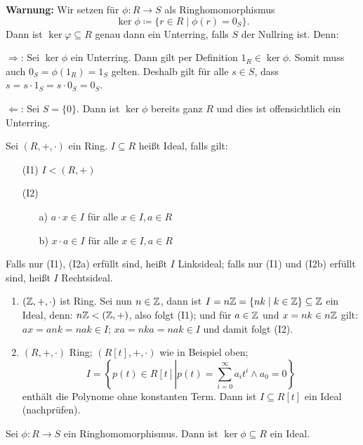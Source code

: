 \documentclass[12pt,a4paper]{scrartcl}
\begin{document}
\noindent
\textbf{Warnung:} Wir setzen für $\phi\colon R\to S$ als Ringhomomorphismus
\[\ker\phi \coloneqq \{r\in R\mid\phi(r)= 0_S\}.\] Dann ist $\ker\varphi\subseteq R$ genau dann ein Unterring, falls $S$ der Nullring ist. Denn:

\glqq $\Rightarrow$\grqq: Sei $\ker\phi$ ein Unterring. Dann gilt per Definition $1_R\in \ker \phi$. Somit muss auch $0_S = \phi (1_R) = 1_S$ gelten. Deshalb gilt für alle $s\in S$, dass $s = s\cdot 1_S = s\cdot 0_S = 0_S$.

\glqq $\Leftarrow$\grqq: Sei $S = \{0\}$. Dann ist $\ker\phi$ bereits ganz $R$ und dies ist offensichtlich ein Unterring.

\begin{defi}
	Sei $(R,+,\cdot)$ ein Ring. $I\subseteq R$ heißt Ideal, falls gilt:
	\begin{itemize}
		\item[(I1)] $I<(R,+)$
		\item[(I2)] \begin{itemize}
			\item[a)] $a\cdot x \in I$ für alle $x\in I, a\in R$
			\item[b)] $x\cdot a \in I$ für alle $x\in I, a\in R$
		\end{itemize}
	\end{itemize}
	Falls nur (I1), (I2a) erfüllt sind, heißt $I$ Linksideal; falls nur (I1) und (I2b) erfüllt sind, heißt $I$ Rechtsideal.
\end{defi}

\begin{bsp} \label{bsp:rt_r}
	\leavevmode
	\begin{enumerate}
		\item $(\mathbb Z,+,\cdot)$ ist Ring. Sei nun $n\in\mathbb Z$, dann ist $I= n\mathbb Z = \{nk\mid k\in\mathbb Z\}\subseteq \mathbb Z$ ein Ideal, denn: $n\mathbb Z<(\mathbb Z,+)$, also folgt (I1); und für $a\in\mathbb Z$ und $x = nk\in n\mathbb Z$ gilt: $ax = ank = nak\in I$; $xa = nka  = nak \in I$ und damit folgt (I2).
		
		\item $(R,+,\cdot)$ Ring; $(R[t],+,\cdot)$ wie in Beispiel oben; \[I = \left\{p(t)\in R[t]\left| p(t) = \sum_{i = 0}^{\infty}a_it^i \wedge a_0 = 0\right.\right\}\] enthält die Polynome ohne konstanten Term. Dann ist $I\subseteq R[t]$ ein Ideal (nachprüfen).
	\end{enumerate}
\end{bsp}


\begin{lem} \label{lem:kerid_r}
	Sei $\phi\colon R\to S$ ein Ringhomomorphismus. Dann ist $\ker\phi \subseteq R$ ein Ideal.
\end{lem}
\end{document}
